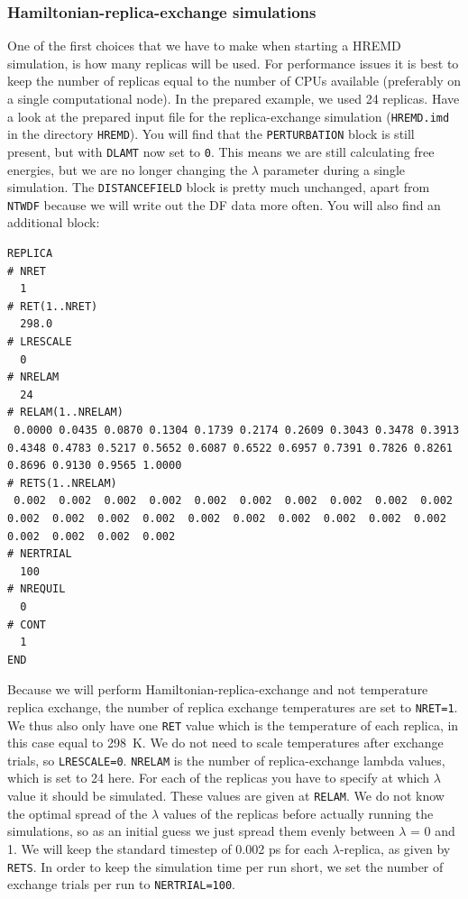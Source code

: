\subsubsection{Hamiltonian-replica-exchange simulations}
One of the first choices that we have to make when starting a HREMD simulation, is how many replicas will be used. 
For performance issues it is best to keep the number of replicas equal to the number of CPUs available (preferably on a single computational node). 
In the prepared example, we used 24 replicas. Have a look at the prepared input file for the replica-exchange simulation (\texttt{HREMD.imd} in the directory \texttt{HREMD}). 
You will find that the \texttt{PERTURBATION} block is still present, but with \texttt{DLAMT} now set to \texttt{0}. 
This means we are still calculating free energies, but we are no longer changing the $\lambda$ parameter during a single simulation. 
The \texttt{DISTANCEFIELD} block is pretty much unchanged, apart from \texttt{NTWDF} because we will write out the DF data more often. You will also find an additional block:
\begin{lstlisting}
REPLICA
# NRET
  1
# RET(1..NRET)
  298.0
# LRESCALE
  0
# NRELAM
  24
# RELAM(1..NRELAM)
 0.0000 0.0435 0.0870 0.1304 0.1739 0.2174 0.2609 0.3043 0.3478 0.3913 0.4348 0.4783 0.5217 0.5652 0.6087 0.6522 0.6957 0.7391 0.7826 0.8261 0.8696 0.9130 0.9565 1.0000
# RETS(1..NRELAM)
 0.002  0.002  0.002  0.002  0.002  0.002  0.002  0.002  0.002  0.002  0.002  0.002  0.002  0.002  0.002  0.002  0.002  0.002  0.002  0.002  0.002  0.002  0.002  0.002
# NERTRIAL
  100
# NREQUIL
  0
# CONT
  1
END
\end{lstlisting}
Because we will perform Hamiltonian-replica-exchange and not temperature replica exchange, the number of replica exchange temperatures are set to \texttt{NRET=1}. 
We thus also only have one \texttt{RET} value which is the temperature of each replica, in this case equal to 298~K. 
We do not need to scale temperatures after exchange trials, so \texttt{LRESCALE=0}. \texttt{NRELAM} is the number of replica-exchange lambda values, which is set to 24 here. 
For each of the replicas you have to specify at which $\lambda$ value it should be simulated. These values are given at \texttt{RELAM}. 
We do not know the optimal spread of the $\lambda$ values of the replicas before actually running the simulations, so as an initial guess we just spread them evenly between $\lambda$ = 0 and 1. 
We will keep the standard timestep of 0.002 ps for each $\lambda$-replica, as given by \texttt{RETS}. 
In order to keep the simulation time per run short, we set the number of exchange trials per run to \texttt{NERTRIAL=100}. 
